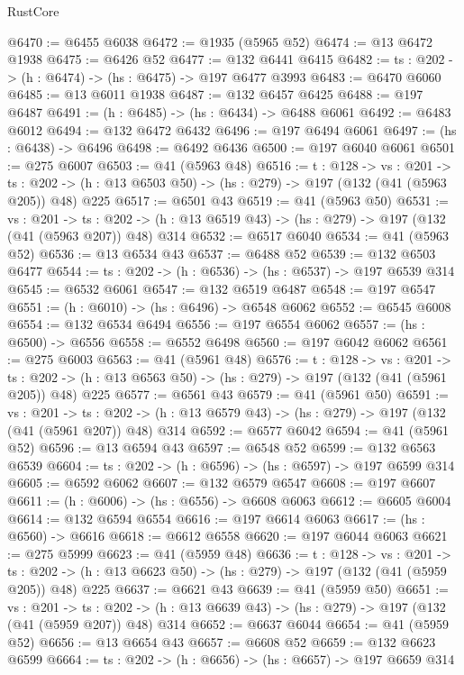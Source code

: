 \begin{lexlean}{RustCore}
\begin{coremodule}
@6470 := @6455 @6038
@6472 := @1935 (@5965 @52)
@6474 := @13 @6472 @1938
@6475 := @6426 @52
@6477 := @132 @6441 @6415
@6482 := {ts : @202} -> (h : @6474) -> (hs : @6475) -> @197 @6477 @3993
@6483 := @6470 @6060
@6485 := @13 @6011 @1938
@6487 := @132 @6457 @6425
@6488 := @197 @6487
@6491 := (h : @6485) -> (hs : @6434) -> @6488 @6061
@6492 := @6483 @6012
@6494 := @132 @6472 @6432
@6496 := @197 @6494 @6061
@6497 := (hs : @6438) -> @6496
@6498 := @6492 @6436
@6500 := @197 @6040 @6061
@6501 := @275 @6007
@6503 := @41 (@5963 @48)
@6516 := {t : @128} ->
  {vs : @201} ->
  {ts : @202} -> (h : @13 @6503 @50) -> (hs : @279) -> @197 (@132 (@41 (@5963 @205)) @48) @225
@6517 := @6501 @43
@6519 := @41 (@5963 @50)
@6531 := {vs : @201} ->
  {ts : @202} -> (h : @13 @6519 @43) -> (hs : @279) -> @197 (@132 (@41 (@5963 @207)) @48) @314
@6532 := @6517 @6040
@6534 := @41 (@5963 @52)
@6536 := @13 @6534 @43
@6537 := @6488 @52
@6539 := @132 @6503 @6477
@6544 := {ts : @202} -> (h : @6536) -> (hs : @6537) -> @197 @6539 @314
@6545 := @6532 @6061
@6547 := @132 @6519 @6487
@6548 := @197 @6547
@6551 := (h : @6010) -> (hs : @6496) -> @6548 @6062
@6552 := @6545 @6008
@6554 := @132 @6534 @6494
@6556 := @197 @6554 @6062
@6557 := (hs : @6500) -> @6556
@6558 := @6552 @6498
@6560 := @197 @6042 @6062
@6561 := @275 @6003
@6563 := @41 (@5961 @48)
@6576 := {t : @128} ->
  {vs : @201} ->
  {ts : @202} -> (h : @13 @6563 @50) -> (hs : @279) -> @197 (@132 (@41 (@5961 @205)) @48) @225
@6577 := @6561 @43
@6579 := @41 (@5961 @50)
@6591 := {vs : @201} ->
  {ts : @202} -> (h : @13 @6579 @43) -> (hs : @279) -> @197 (@132 (@41 (@5961 @207)) @48) @314
@6592 := @6577 @6042
@6594 := @41 (@5961 @52)
@6596 := @13 @6594 @43
@6597 := @6548 @52
@6599 := @132 @6563 @6539
@6604 := {ts : @202} -> (h : @6596) -> (hs : @6597) -> @197 @6599 @314
@6605 := @6592 @6062
@6607 := @132 @6579 @6547
@6608 := @197 @6607
@6611 := (h : @6006) -> (hs : @6556) -> @6608 @6063
@6612 := @6605 @6004
@6614 := @132 @6594 @6554
@6616 := @197 @6614 @6063
@6617 := (hs : @6560) -> @6616
@6618 := @6612 @6558
@6620 := @197 @6044 @6063
@6621 := @275 @5999
@6623 := @41 (@5959 @48)
@6636 := {t : @128} ->
  {vs : @201} ->
  {ts : @202} -> (h : @13 @6623 @50) -> (hs : @279) -> @197 (@132 (@41 (@5959 @205)) @48) @225
@6637 := @6621 @43
@6639 := @41 (@5959 @50)
@6651 := {vs : @201} ->
  {ts : @202} -> (h : @13 @6639 @43) -> (hs : @279) -> @197 (@132 (@41 (@5959 @207)) @48) @314
@6652 := @6637 @6044
@6654 := @41 (@5959 @52)
@6656 := @13 @6654 @43
@6657 := @6608 @52
@6659 := @132 @6623 @6599
@6664 := {ts : @202} -> (h : @6656) -> (hs : @6657) -> @197 @6659 @314

\end{coremodule}
\end{lexlean}
